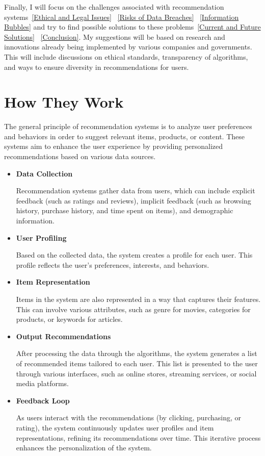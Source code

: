 \documentclass[10pt,twoside,slovak,a4paper]{article}
\begin{document}
Finally, I will focus on the challenges associated with recommendation systems~\ref{Ethical and Legal Issues} ~\ref{Risks of Data Breaches} ~\ref{Information Bubbles} and try to find possible solutions to these problems~\ref{Current and Future Solutions} ~\ref{Conclusion}. My suggestions will be based on research and innovations already being implemented by various companies and governments. This will include discussions on ethical standards, transparency of algorithms, and ways to ensure diversity in recommendations for users.




\section{How They Work} \label{How They Work}
The general principle of recommendation systems is to analyze user preferences and behaviors in order to suggest relevant items, products, or content. These systems aim to enhance the user experience by providing personalized recommendations based on various data sources.

\begin{itemize}
\newpage
\item \textbf{Data Collection}

Recommendation systems gather data from users, which can include explicit feedback (such as ratings and reviews), implicit feedback (such as browsing history, purchase history, and time spent on items), and demographic information.
\item \textbf{User Profiling}

Based on the collected data, the system creates a profile for each user. This profile reflects the user’s preferences, interests, and behaviors.
\item \textbf{Item Representation}

 Items in the system are also represented in a way that captures their features. This can involve various attributes, such as genre for movies, categories for products, or keywords for articles.
\item \textbf{Output Recommendations}

 After processing the data through the algorithms, the system generates a list of recommended items tailored to each user. This list is presented to the user through various interfaces, such as online stores, streaming services, or social media platforms.
 \item \textbf{Feedback Loop}
 
 As users interact with the recommendations (by clicking, purchasing, or rating), the system continuously updates user profiles and item representations, refining its recommendations over time. This iterative process enhances the personalization of the system.
\end{itemize}
\end{document}
